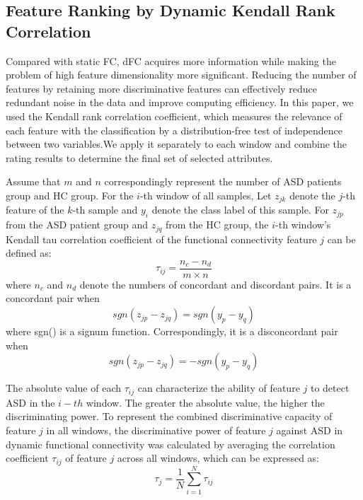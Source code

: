 \documentclass[a4paper]{cas-dc}
\begin{document}
\subsection{Feature Ranking by Dynamic Kendall Rank Correlation}
Compared with static FC, dFC acquires more information while making the problem of high feature dimensionality more significant. Reducing the number of features by retaining more discriminative features can effectively reduce redundant noise in the data and improve computing efficiency. In this paper, we used the Kendall rank correlation coefficient, which measures the relevance of each feature with the classification by a distribution-free test of independence between two variables.We apply it separately to each window and combine the rating results to determine the final set of selected attributes. 

Assume that $m$ and $n$ correspondingly represent the number of ASD patients group and HC group. For the $i$-th window of all samples, Let $z_{jk}$ denote the $j$-th feature of the $k$-th sample and $y_i$ denote the class label of this sample. For $z_{jp}$ from the ASD patient group and $z_{jq}$ from the HC group, the $i$-th window's Kendall tau correlation coefficient of the functional connectivity feature $j$ can be defined as:
\begin{equation}
	\tau_{ij} = \frac{n_c - n_d}{m \times n}
\end{equation}
where $n_c$ and $n_d$ denote the numbers of concordant and discordant pairs. It is a concordant pair when
\begin{equation}
	sgn(z_{jp} - z_{jq}) = sgn(y_p-y_q)
\end{equation}
where sgn() is a signum function. Correspondingly, it is a disconcordant pair when
\begin{equation}
	sgn(z_{jp} - z_{jq}) = -sgn(y_p-y_q)
\end{equation}

The absolute value of each $\tau_{ij}$ can characterize the ability of feature $j$ to detect ASD in the $i-th$ window. The greater the absolute value, the higher the discriminating power. To represent the combined discriminative capacity of feature $j$ in all windows, the discriminative power of feature $j$ against ASD in dynamic functional connectivity was calculated by averaging the correlation coefficient $\tau_{ij}$ of feature $j$ across all windows, which can be expressed as:
\begin{equation}
	\tau_{j} =  \frac{1}{N}\sum_{i=1}^{N}\tau_{ij}
\end{equation}
\end{document}
